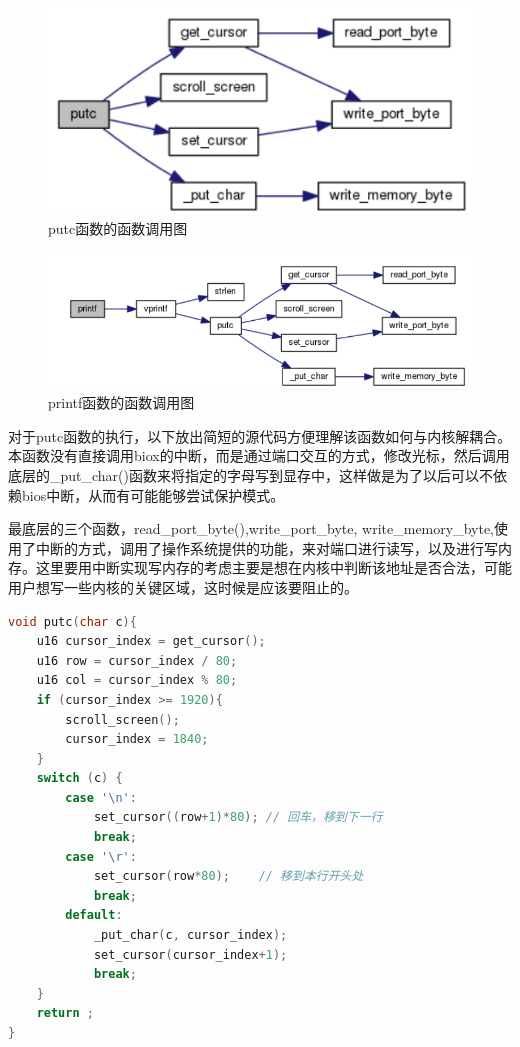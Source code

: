 \documentclass[forprint]{WHUBachelor}
\begin{document}
\begin{figure}[htp]
  \centering
  \includegraphics[width=13cm]{"./figure/putc-call-graph.png"}
  \caption{putc函数的函数调用图}
  \label{fig:putc}
\end{figure}

\begin{figure}[htp]
  \centering
  \includegraphics[width=13cm]{"./figure/printf-call-graph.png"}
  \caption{printf函数的函数调用图}
  \label{fig:printf}
\end{figure}

对于putc函数的执行，以下放出简短的源代码方便理解该函数如何与内核解耦合。
本函数没有直接调用biox的中断，而是通过端口交互的方式，修改光标，然后调用底层的_put_char()函数来将指定的字母写到显存中，这样做是为了以后可以不依赖bios中断，从而有可能能够尝试保护模式。

最底层的三个函数，read_port_byte(),write_port_byte, write_memory_byte,使用了中断的方式，调用了操作系统提供的功能，来对端口进行读写，以及进行写内存。这里要用中断实现写内存的考虑主要是想在内核中判断该地址是否合法，可能用户想写一些内核的关键区域，这时候是应该要阻止的。

\begin{lstlisting}[language=c]
void putc(char c){
    u16 cursor_index = get_cursor();
    u16 row = cursor_index / 80;
    u16 col = cursor_index % 80;
    if (cursor_index >= 1920){
        scroll_screen();
        cursor_index = 1840;
    }
    switch (c) {
        case '\n':
            set_cursor((row+1)*80); // 回车，移到下一行
            break;
        case '\r':
            set_cursor(row*80);    // 移到本行开头处
            break;
        default:
            _put_char(c, cursor_index);
            set_cursor(cursor_index+1);
            break;
    }
    return ;
}
\end{lstlisting}
\end{document}
